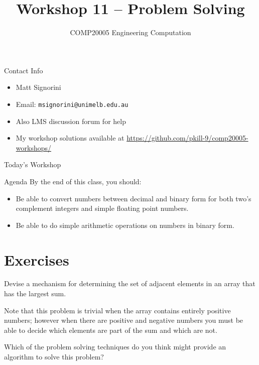 \documentclass{beamer}
\title{Workshop 11 -- Problem Solving}
\author{COMP20005 Engineering Computation}
\institute{The University of Melbourne}
\begin{document}
\renewcommand{\tt}[1]{\texttt{#1}}

\begin{frame}
    \titlepage
\end{frame}

\begin{frame}{Contact Info}
    \begin{itemize}
        \item Matt Signorini
        \item Email: \tt{msignorini@unimelb.edu.au}
        \item Also LMS discussion forum for help
        \item My workshop solutions available at \url{https://github.com/pkill-9/comp20005-workshops/}
    \end{itemize}
\end{frame}

\begin{frame}{Today's Workshop}
    \begin{block}{Agenda}
        By the end of this class, you should:
        \begin{itemize}
            \item Be able to convert numbers between decimal and binary
                form for both two's complement integers and simple 
                floating point numbers.
            \item Be able to do simple arithmetic operations on numbers
                in binary form.
        \end{itemize}
    \end{block}
\end{frame}

\section{Exercises}

\begin{frame}{9.7}
    Devise a mechanism for determining the set of adjacent elements in an
    array that has the largest sum.

    Note that this problem is trivial when the array contains entirely
    positive numbers; however when there are positive and negative numbers
    you must be able to decide which elements are part of the sum and
    which are not.

    Which of the problem solving techniques do you think might provide an
    algorithm to solve this problem?
\end{frame}
\end{document}
